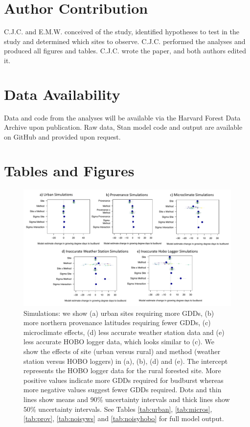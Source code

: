 \documentclass{article}\usepackage[]{graphicx}\usepackage[]{color}
\begin{document}
\section*{Author Contribution} 
C.J.C. and E.M.W. conceived of the study, identified hypotheses to test in the study and determined which sites to observe. C.J.C. performed the analyses and produced all figures and tables. C.J.C. wrote the paper, and both authors edited it.

\section*{Data Availability}
Data and code from the analyses will be available via the Harvard Forest Data Archive upon publication. Raw data, {Stan} model code and output are available on GitHub and provided upon request.


\section*{Tables and Figures}

\begin{figure}[H]
      \centering
      \includegraphics[width=16cm]{..//analyses/figures/muplot_sims.pdf}
\caption{ Simulations: we show (a) urban sites requiring more GDDs, (b) more northern provenance latitudes requiring fewer GDDs, (c) microclimate effects, (d) less accurate weather station data and (e) less accurate HOBO logger data, which looks similar to (c). We show the effects of site (urban versus rural) and method (weather station versus HOBO loggers) in (a), (b), (d) and (e). The intercept represents the HOBO logger data for the rural forested site. More positive values indicate more GDDs required for budburst whereas more negative values suggest fewer GDDs required. Dots and thin lines show means and 90\% uncertainty intervals and thick lines show 50\% uncertainty intervals. See Tables \ref{tab:urban}, \ref{tab:micros}, \ref{tab:prov}, \ref{tab:noisyws} and \ref{tab:noisyhobo} for full model output. } 
\label{fig:musims}
\end{figure}
\end{document}
